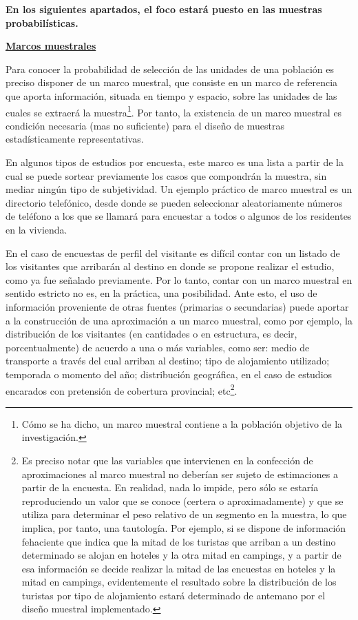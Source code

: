 \documentclass[
]{book}
\begin{document}
\textbf{En los siguientes apartados, el foco estará puesto en las muestras probabilísticas.}

\underline{\textbf{Marcos muestrales}}

Para conocer la probabilidad de selección de las unidades de una población es preciso disponer de un marco muestral, que consiste en un marco de referencia que aporta información, situada en tiempo y espacio, sobre las unidades de las cuales se extraerá la muestra\footnote{Cómo se ha dicho, un marco muestral contiene a la población objetivo de la investigación.}. Por tanto, la existencia de un marco muestral es condición necesaria (mas no suficiente) para el diseño de muestras estadísticamente representativas.

En algunos tipos de estudios por encuesta, este marco es una lista a partir de la cual se puede sortear previamente los casos que compondrán la muestra, sin mediar ningún tipo de subjetividad. Un ejemplo práctico de marco muestral es un directorio telefónico, desde donde se pueden seleccionar aleatoriamente números de teléfono a los que se llamará para encuestar a todos o algunos de los residentes en la vivienda.

En el caso de encuestas de perfil del visitante es difícil contar con un listado de los visitantes que arribarán al destino en donde se propone realizar el estudio, como ya fue señalado previamente. Por lo tanto, contar con un marco muestral en sentido estricto no es, en la práctica, una posibilidad. Ante esto, el uso de información proveniente de otras fuentes (primarias o secundarias) puede aportar a la construcción de una aproximación a un marco muestral, como por ejemplo, la distribución de los visitantes (en cantidades o en estructura, es decir, porcentualmente) de acuerdo a una o más variables, como ser: medio de transporte a través del cual arriban al destino; tipo de alojamiento utilizado; temporada o momento del año; distribución geográfica, en el caso de estudios encarados con pretensión de cobertura provincial; etc\footnote{Es preciso notar que las variables que intervienen en la confección de aproximaciones al marco muestral no deberían ser sujeto de estimaciones a partir de la encuesta. En realidad, nada lo impide, pero sólo se estaría reproduciendo un valor que se conoce (certera o aproximadamente) y que se utiliza para determinar el peso relativo de un segmento en la muestra, lo que implica, por tanto, una tautología. Por ejemplo, si se dispone de información fehaciente que indica que la mitad de los turistas que arriban a un destino determinado se alojan en hoteles y la otra mitad en campings, y a partir de esa información se decide realizar la mitad de las encuestas en hoteles y la mitad en campings, evidentemente el resultado sobre la distribución de los turistas por tipo de alojamiento estará determinado de antemano por el diseño muestral implementado.}.\\
\end{document}

